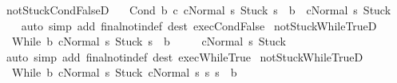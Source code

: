 \begin{isabellebody}
\endisatagproof
{\isafoldproof}%
%
\isadelimproof
\isanewline
%
\endisadelimproof
\isanewline
{}\isamarkupfalse%
\ notStuck{\isacharunderscore}CondFalseD{\isacharcolon}\ \isanewline
\ \ {\isachardoublequoteopen}{\isasymlbrakk}{\isasymGamma}{\isasymturnstile}{\isasymlangle}Cond\ b\ c{}\ c{}{\isacharcomma}Normal\ s{\isasymrangle}\ {\isasymRightarrow}{\isasymnotin}{\isacharbraceleft}Stuck{\isacharbraceright}{\isacharsemicolon}\ s\ {\isasymnotin}\ b{\isasymrbrakk}\ {\isasymLongrightarrow}\ {\isasymGamma}{\isasymturnstile}{\isasymlangle}c{}{\isacharcomma}Normal\ s{\isasymrangle}\ {\isasymRightarrow}{\isasymnotin}{\isacharbraceleft}Stuck{\isacharbraceright}{\isachardoublequoteclose}\isanewline
%
\isadelimproof
\ \ %
\endisadelimproof
%
\isatagproof
{}\isamarkupfalse%
\ {\isacharparenleft}auto\ simp\ add{\isacharcolon}\ final{\isacharunderscore}notin{\isacharunderscore}def\ dest{\isacharcolon}\ exec{\isachardot}CondFalse{\isacharparenright}%
\endisatagproof
{\isafoldproof}%
%
\isadelimproof
\isanewline
%
\endisadelimproof
\isanewline
{}\isamarkupfalse%
\ notStuck{\isacharunderscore}WhileTrueD{}{\isacharcolon}\ \isanewline
\ \ {\isachardoublequoteopen}{\isasymlbrakk}{\isasymGamma}{\isasymturnstile}{\isasymlangle}While\ b\ c{\isacharcomma}Normal\ s{\isasymrangle}\ {\isasymRightarrow}{\isasymnotin}{\isacharbraceleft}Stuck{\isacharbraceright}{\isacharsemicolon}\ s\ {\isasymin}\ b{\isasymrbrakk}\ \isanewline
\ \ \ {\isasymLongrightarrow}\ {\isasymGamma}{\isasymturnstile}{\isasymlangle}c{\isacharcomma}Normal\ s{\isasymrangle}\ {\isasymRightarrow}{\isasymnotin}{\isacharbraceleft}Stuck{\isacharbraceright}{\isachardoublequoteclose}\isanewline
%
\isadelimproof
\ \ %
\endisadelimproof
%
\isatagproof
{}\isamarkupfalse%
\ {\isacharparenleft}auto\ simp\ add{\isacharcolon}\ final{\isacharunderscore}notin{\isacharunderscore}def\ dest{\isacharcolon}\ exec{\isachardot}WhileTrue{\isacharparenright}%
\endisatagproof
{\isafoldproof}%
%
\isadelimproof
\isanewline
%
\endisadelimproof
\isanewline
{}\isamarkupfalse%
\ notStuck{\isacharunderscore}WhileTrueD{}{\isacharcolon}\ \isanewline
\ \ {\isachardoublequoteopen}{\isasymlbrakk}{\isasymGamma}{\isasymturnstile}{\isasymlangle}While\ b\ c{\isacharcomma}Normal\ s{\isasymrangle}\ {\isasymRightarrow}{\isasymnotin}{\isacharbraceleft}Stuck{\isacharbraceright}{\isacharsemicolon}\ {\isasymGamma}{\isasymturnstile}{\isasymlangle}c{\isacharcomma}Normal\ s{\isasymrangle}\ {\isasymRightarrow}s{\isacharprime}{\isacharsemicolon}\ s\ {\isasymin}\ b{\isasymrbrakk}\ \isanewline

\end{isabellebody}
